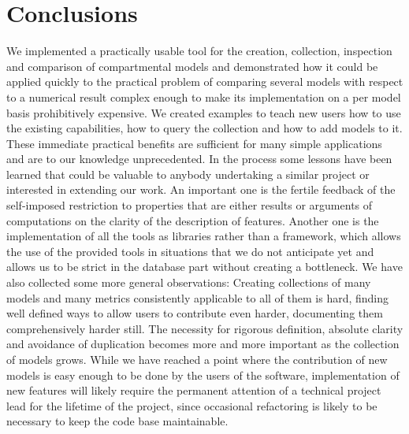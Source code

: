 \section{Conclusions} \label{sec:ConclusionsAndOutlook}
We implemented a
practically usable tool for the creation, collection, inspection and comparison
of compartmental models and demonstrated how it could be applied quickly to the
practical problem of comparing several models with respect to a numerical
result complex enough to make its implementation on a per model basis
prohibitively expensive.  We created examples to teach new users how to use the
existing capabilities, how to query the collection and how to add models to it.
These immediate practical benefits are sufficient for many simple applications and
are to our knowledge unprecedented.  In the process  some lessons have been
learned that could be valuable to anybody undertaking a similar project or
interested in extending our work.  An important one is the fertile feedback of
the self-imposed restriction to properties that are either results or arguments
of computations on the clarity of the description of features.  Another one is
the implementation of all the tools as libraries rather than a framework, which
allows the use of the provided tools in situations that we do not anticipate yet
and allows us to be strict in the database part  without creating a bottleneck.
We have also collected some more general observations: Creating collections of
many models and many metrics consistently applicable to all of them is hard,
finding well defined ways to allow users to contribute even harder, documenting
them comprehensively harder still.  The necessity for rigorous definition,
absolute clarity and avoidance of duplication becomes more and more important
as the collection of models grows.  While we have reached a point where the
contribution of new models is easy enough to be done by the users of the
software, implementation of new features will likely
require the permanent attention of a technical project lead for 
the lifetime of the project, since occasional refactoring is likely to be necessary
to keep the code base maintainable.
